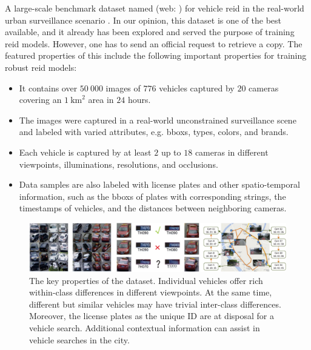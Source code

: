 A large-scale benchmark dataset named  (web: \cite{veridataset}) for vehicle \gls{reid} in the real-world urban surveillance scenario \cite{Liu2018}. In our opinion, this dataset is one of the best available, and it already has been explored and served the purpose of training \gls{reid} models. However, one has to send an official request to retrieve a copy. The featured properties of this include the following important properties for training robust \gls{reid} models:

\begin{itemize}
    \item It contains over $50\ 000$ images of $776$ vehicles captured by $20$ cameras covering an $1\  \text{km}^2$ area in $24$ hours.
    
    \item The images were captured in a real-world unconstrained surveillance scene and labeled with varied attributes, e.g. \glspl{bbox}, types, colors, and brands.
    
    \item Each vehicle is captured by at least $2$ up to $18$ cameras in different viewpoints, illuminations, resolutions, and occlusions.
    
    \item Data samples are also labeled with license plates and other spatio-temporal information, such as the \glspl{bbox} of plates with corresponding strings, the timestamps of vehicles, and the distances between neighboring cameras.
\end{itemize}

\begin{figure}[t]
    \centerline{\includegraphics[width=\linewidth]{figures/datasets/veri776__overview.pdf}}
    \caption[ dataset]{The key properties of the  dataset. Individual vehicles offer rich within-class differences in different viewpoints. At the same time, different but similar vehicles may have trivial inter-class differences. Moreover, the license plates as the unique ID are at disposal for a vehicle search. Additional contextual information can assist in vehicle searches in the city. }
    \label{fig:DatasetVeRI776}
\end{figure}
